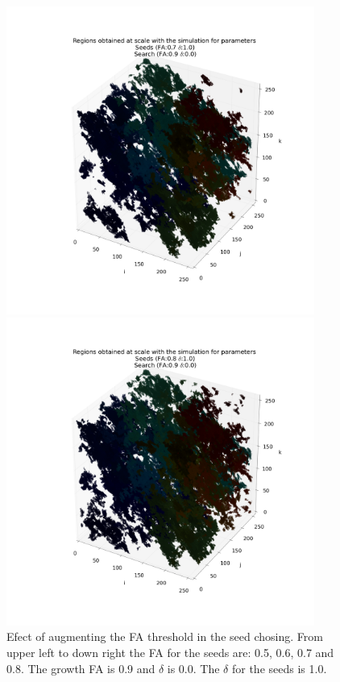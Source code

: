 \documentclass[12pt]{article}
\begin{document}
\begin{figure}[ht]
\begin{minipage}{.45\textwidth}
\end{minipage}
\begin{minipage}{.45\textwidth}
  \centering
  \includegraphics[width=0.9\textwidth]{groups/3d/seeds_FA_7/regions_nonoise_seeds_FA_07_Trace_10_search_FA_09_Trace_00_.png}
\end{minipage}
\begin{minipage}{.45\textwidth}
  \centering
  \includegraphics[width=0.9\textwidth]{groups/3d/seeds_FA_8/regions_nonoise_seeds_FA_08_Trace_10_search_FA_09_Trace_00_.png}
\end{minipage}
\caption{Efect of augmenting the FA threshold in the seed chosing. From upper left to down right the FA for the seeds are: 0.5, 0.6, 0.7 and 0.8. The growth FA is 0.9 and $\delta$ is 0.0. The $\delta$ for the seeds is 1.0.} \label{fg:3D_FA_seeds}
\end{figure}
\FloatBarrier
\end{document}

